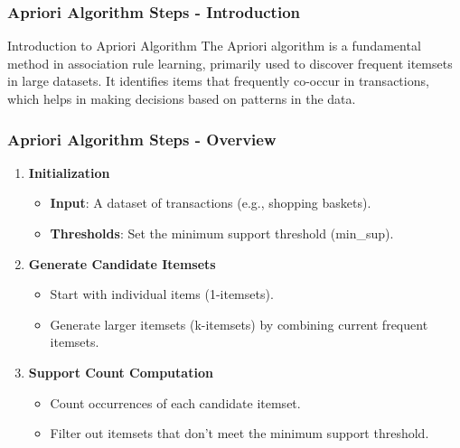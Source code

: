 \documentclass[aspectratio=169]{beamer}
\begin{document}
\begin{frame}[fragile]
    \frametitle{Apriori Algorithm Steps - Introduction}
    \begin{block}{Introduction to Apriori Algorithm}
        The Apriori algorithm is a fundamental method in association rule learning, primarily used to discover frequent itemsets in large datasets. It identifies items that frequently co-occur in transactions, which helps in making decisions based on patterns in the data.
    \end{block}
\end{frame}

\begin{frame}[fragile]
    \frametitle{Apriori Algorithm Steps - Overview}
    \begin{enumerate}
        \item \textbf{Initialization}
            \begin{itemize}
                \item \textbf{Input}: A dataset of transactions (e.g., shopping baskets).
                \item \textbf{Thresholds}: Set the minimum support threshold (min\_sup).
            \end{itemize}
        \item \textbf{Generate Candidate Itemsets}
            \begin{itemize}
                \item Start with individual items (1-itemsets).
                \item Generate larger itemsets (k-itemsets) by combining current frequent itemsets.
            \end{itemize}
        \item \textbf{Support Count Computation}
            \begin{itemize}
                \item Count occurrences of each candidate itemset.
                \item Filter out itemsets that don’t meet the minimum support threshold.
            \end{itemize}
    \end{enumerate}
\end{frame}
\end{document}
